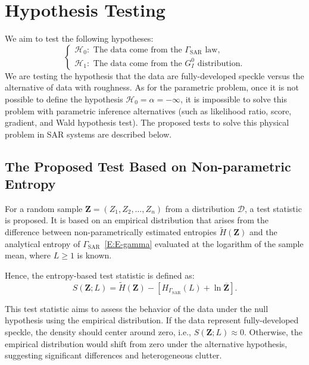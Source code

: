 \documentclass[remotesensing,article,submit,moreauthors,pdftex]{Definitions/mdpi}
\begin{document}
\section{Hypothesis Testing}\label{sec:test}

We aim to test the following hypotheses: \[
\begin{cases}
  \mathcal{H}_0: \text{ The data come from the } \Gamma_{\text{SAR}}\text{ law},\\ 
  \mathcal{H}_1:\text{ The data come from the } G_I^0 \text{ distribution}.
\end{cases}
\] We are testing the hypothesis that the data are fully-developed
speckle versus the alternative of data with roughness. As for the
parametric problem, once it is not possible to define the hypothesis
\(\mathcal{H}_0=\alpha=-\infty\), it is impossible to solve this problem
with parametric inference alternatives (such as likelihood ratio, score,
gradient, and Wald hypothesis test). The proposed tests to solve this
physical problem in SAR systems are described below.

\subsection{The Proposed Test Based on Non-parametric
Entropy}\label{the-proposed-test-based-on-non-parametric-entropy}

For a random sample \(\bm{Z}=(Z_1, Z_2,\ldots,Z_n)\) from a distribution
\(\mathcal{D}\), a test statistic is proposed. It is based on an
empirical distribution that arises from the difference between
non-parametrically estimated entropies \(\widetilde{H}(\bm{Z})\) and the
analytical entropy of \(\Gamma_{\text{SAR}}\)~\eqref{E:E-gamma}
evaluated at the logarithm of the sample mean, where \(L\geq 1\) is
known.

Hence, the entropy-based test statistic is defined as: \begin{equation}
\label{Eq:test_e}
S(\bm{Z};L)= \widetilde{H}(\bm{Z})-\left[H_{\Gamma_{\text{SAR}}}(L)+\ln \overline{\bm{Z}}\right].
\end{equation}

This test statistic aims to assess the behavior of the data under the
null hypothesis using the empirical distribution. If the data represent
fully-developed speckle, the density should center around zero, i.e.,
\(S(\bm{Z};L)\approx 0\). Otherwise, the empirical distribution would
shift from zero under the alternative hypothesis, suggesting significant
differences and heterogeneous clutter.
\end{document}
